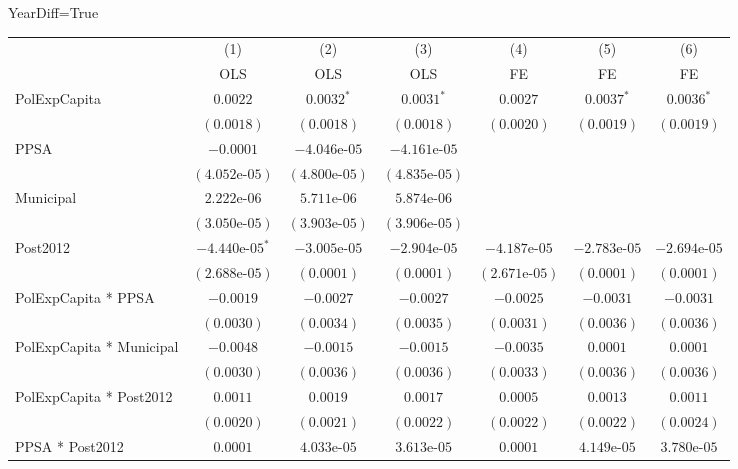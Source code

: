 \begin{table}[H]
    \centering
    \scriptsize
    \begin{minipage}{\textwidth}
    \centering
    {\normalsize YearDiff=True}
    \vspace{6pt}
    \begin{tabular}{lcccccc}
        \toprule
         & (1) & (2) & (3) & (4) & (5) & (6) \\
         & OLS & OLS & OLS & FE & FE & FE \\
        \midrule
        PolExpCapita & $0.0022$ & $0.0032^{*}$ & $0.0031^{*}$ & $0.0027$ & $0.0037^{*}$ & $0.0036^{*}$ \\
         & $(0.0018)$ & $(0.0018)$ & $(0.0018)$ & $(0.0020)$ & $(0.0019)$ & $(0.0019)$ \\[4pt]
        PPSA & $-0.0001$ & $-4.046\text{e-}05$ & $-4.161\text{e-}05$ &  &  &  \\
         & $(4.052\text{e-}05)$ & $(4.800\text{e-}05)$ & $(4.835\text{e-}05)$ &  &  &  \\[4pt]
        Municipal & $2.222\text{e-}06$ & $5.711\text{e-}06$ & $5.874\text{e-}06$ &  &  &  \\
         & $(3.050\text{e-}05)$ & $(3.903\text{e-}05)$ & $(3.906\text{e-}05)$ &  &  &  \\[4pt]
        Post2012 & $-4.440\text{e-}05^{*}$ & $-3.005\text{e-}05$ & $-2.904\text{e-}05$ & $-4.187\text{e-}05$ & $-2.783\text{e-}05$ & $-2.694\text{e-}05$ \\
         & $(2.688\text{e-}05)$ & $(0.0001)$ & $(0.0001)$ & $(2.671\text{e-}05)$ & $(0.0001)$ & $(0.0001)$ \\[4pt]
        PolExpCapita * PPSA & $-0.0019$ & $-0.0027$ & $-0.0027$ & $-0.0025$ & $-0.0031$ & $-0.0031$ \\
         & $(0.0030)$ & $(0.0034)$ & $(0.0035)$ & $(0.0031)$ & $(0.0036)$ & $(0.0036)$ \\[4pt]
        PolExpCapita * Municipal & $-0.0048$ & $-0.0015$ & $-0.0015$ & $-0.0035$ & $0.0001$ & $0.0001$ \\
         & $(0.0030)$ & $(0.0036)$ & $(0.0036)$ & $(0.0033)$ & $(0.0036)$ & $(0.0036)$ \\[4pt]
        PolExpCapita * Post2012 & $0.0011$ & $0.0019$ & $0.0017$ & $0.0005$ & $0.0013$ & $0.0011$ \\
         & $(0.0020)$ & $(0.0021)$ & $(0.0022)$ & $(0.0022)$ & $(0.0022)$ & $(0.0024)$ \\[4pt]
        PPSA * Post2012 & $0.0001$ & $4.033\text{e-}05$ & $3.613\text{e-}05$ & $0.0001$ & $4.149\text{e-}05$ & $3.780\text{e-}05$ \\

\end{tabular}
\end{minipage}
\end{table}

